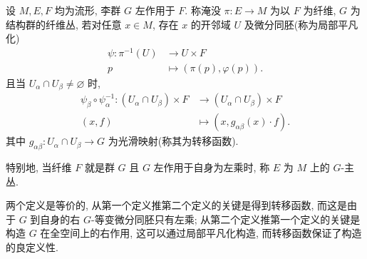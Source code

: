         \begin{definition}[纤维丛, $G$-主丛]
            设 $M,E,F$ 均为流形, 李群 $G$ 左作用于 $F$. 
            称淹没 $\pi:E\rightarrow M$ 为以 $F$ 为纤维,
            $G$ 为结构群的纤维丛, 若对任意 $x\in M$,
            存在 $x$ 的开邻域 $U$ 及微分同胚(称为局部平凡化)
            \begin{align*}
                \psi:\pi^{-1}(U) & \rightarrow U\times F \\
                p &\mapsto (\pi(p),\varphi(p)).
            \end{align*}
            且当 $U_\alpha\cap U_\beta\neq\varnothing$ 时, 
            \begin{align*}
                \psi_\beta\circ\psi_\alpha^{-1}:(U_\alpha\cap U_\beta)
                \times F & \rightarrow (U_\alpha\cap U_\beta)\times F \\
                (x,f) & \mapsto (x,g_{\alpha\beta}(x)\cdot f).
            \end{align*}
            其中 $g_{\alpha\beta}:U_\alpha\cap U_\beta\rightarrow G$ 
            为光滑映射(称其为转移函数).

            特别地, 当纤维 $F$ 就是群 $G$ 且 $G$ 左作用于自身为左乘时, 
            称 $E$ 为 $M$ 上的 $G$-主丛.
        \end{definition}
        \begin{remark}
            两个定义是等价的, 从第一个定义推第二个定义的关键是得到转移函数, 
            而这是由于 $G$ 到自身的右 $G$-等变微分同胚只有左乘; 
            从第二个定义推第一个定义的关键是构造 $G$ 在全空间上的右作用, 
            这可以通过局部平凡化构造, 而转移函数保证了构造的良定义性.
        \end{remark}


